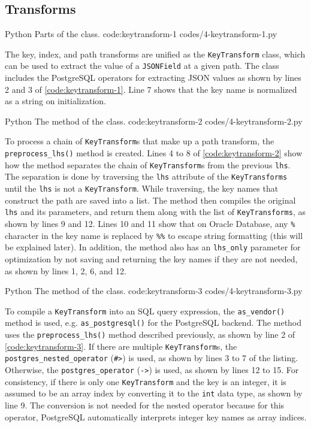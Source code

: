 \subsection{ Transforms}

\listing
{Python}
{Parts of the  class.}
{code:keytransform-1}
{codes/4-keytransform-1.py}

The key, index, and path
transforms are unified as the \verb|KeyTransform| class, which can be used to
extract the value of a \verb|JSONField| at a given path. The class includes the
{PostgreSQL} operators for extracting JSON values as shown by lines 2 and 3
of \autoref{code:keytransform-1}. Line 7 shows that the key name is normalized
as a string on initialization.

\listing
{Python}
{The  method of the  class.}
{code:keytransform-2}
{codes/4-keytransform-2.py}

To process a chain of \verb|KeyTransform|s that make up a path transform, the
\verb|preprocess_lhs()| method is created. Lines 4 to 8 of
\autoref{code:keytransform-2} show how the method separates the chain of
\verb|KeyTransform|s from the previous \verb|lhs|. The separation is done by
traversing the \verb|lhs| attribute of the \verb|KeyTransforms| until the
\verb|lhs| is not a \verb|KeyTransform|. While traversing, the key names that
construct the path are saved into a list. The method then compiles the original
\verb|lhs| and its parameters, and return them along with the list of
\verb|KeyTransforms|, as shown by lines 9 and 12. Lines 10 and 11 show that on
Oracle Database, any \verb|%| character in the key name is replaced by
\verb|%%| to escape string formatting (this will be explained later). In
addition, the method also has an \verb|lhs_only| parameter for optimization by
not saving and returning the key names if they are not needed, as shown by
lines 1, 2, 6, and 12.

\listing
{Python}
{The  method of the  class.}
{code:keytransform-3}
{codes/4-keytransform-3.py}

To compile a \verb|KeyTransform| into an SQL query expression, the
\verb|as_vendor()| method is used, e.g. \verb|as_postgresql()| for the
PostgreSQL backend. The method uses the \verb|preprocess_lhs()| method
described previously, as shown by line 2 of \autoref{code:keytransform-3}. If
there are multiple \verb|KeyTransform|s, the \verb|postgres_nested_operator|
(\verb|#>|) is used, as shown by lines 3 to 7 of the listing. Otherwise, the
\verb|postgres_operator| (\verb|->|) is used, as shown by lines 12 to 15. For
consistency, if there is only one \verb|KeyTransform| and the key is an
integer, it is assumed to be an array index by converting it to the \verb|int|
data type, as shown by line 9. The conversion is not needed for the nested
operator because for this operator, PostgreSQL automatically interprets integer
key names as array indices.

